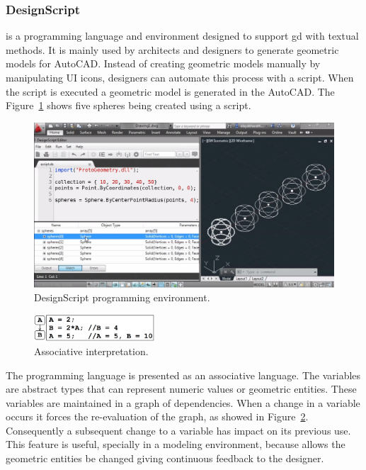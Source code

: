 \subsubsection{DesignScript~\cite{aish2012designscript}} is a programming language and environment designed to support \ac{gd} with textual methods. It is mainly used by architects and designers to generate geometric models for AutoCAD. Instead of creating geometric models manually by manipulating UI icons, designers can automate this process with a script. When the script is executed a geometric model is generated in the AutoCAD. The Figure~\ref{fig:ds} shows five spheres being created using a script.

\begin{figure}[!htbp]
  \centering
  \includegraphics[width=1.0\textwidth]{img/designScriptIDE}
    \caption{DesignScript programming environment.}  
  \label{fig:ds}
\end{figure} 


\begin{figure}
  \vspace{-25pt}
  \begin{center}
    \includegraphics[width=0.4\textwidth]{img/designscript}
  \end{center}
  \vspace{-20pt}
 \caption{Associative interpretation.}  
  \vspace{-20pt}
    \label{fig:designscript}
\end{figure}

The programming language is presented as an associative language. The variables are abstract types that can represent numeric values or geometric entities. These variables are maintained in a graph of dependencies. When a change in a variable occurs it forces the re-evaluation of the graph, as showed in Figure~\ref{fig:designscript}. Consequently a subsequent change to a variable has impact on its previous use. This feature is useful, specially in a modeling environment, because allows the geometric entities be changed giving continuous feedback to the designer.

